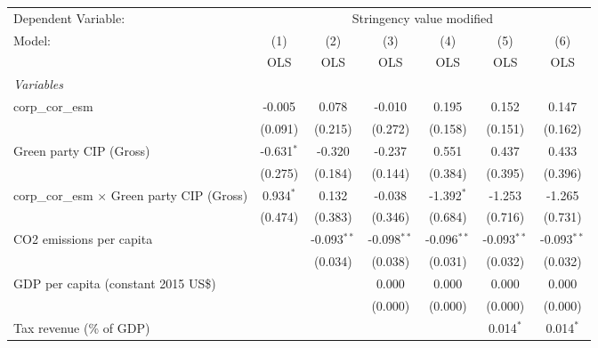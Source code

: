 
\begingroup
\centering
\begin{tabular}{lcccccc}
   \toprule
   Dependent Variable: & \multicolumn{6}{c}{Stringency value modified}\\
   Model:                                             & (1)          & (2)           & (3)           & (4)           & (5)           & (6)\\  
                                                      &  OLS         & OLS           & OLS           & OLS           & OLS           & OLS\\  
   \midrule
   \emph{Variables}\\
   corp\_cor\_esm                                     & -0.005       & 0.078         & -0.010        & 0.195         & 0.152         & 0.147\\   
                                                      & (0.091)      & (0.215)       & (0.272)       & (0.158)       & (0.151)       & (0.162)\\   
   Green party CIP (Gross)                            & -0.631$^{*}$ & -0.320        & -0.237        & 0.551         & 0.437         & 0.433\\   
                                                      & (0.275)      & (0.184)       & (0.144)       & (0.384)       & (0.395)       & (0.396)\\   
   corp\_cor\_esm $\times$ Green party CIP (Gross)    & 0.934$^{*}$  & 0.132         & -0.038        & -1.392$^{*}$  & -1.253        & -1.265\\   
                                                      & (0.474)      & (0.383)       & (0.346)       & (0.684)       & (0.716)       & (0.731)\\   
   CO2 emissions per capita                           &              & -0.093$^{**}$ & -0.098$^{**}$ & -0.096$^{**}$ & -0.093$^{**}$ & -0.093$^{**}$\\   
                                                      &              & (0.034)       & (0.038)       & (0.031)       & (0.032)       & (0.032)\\   
   GDP per capita (constant 2015 US\$)                &              &               & 0.000         & 0.000         & 0.000         & 0.000\\   
                                                      &              &               & (0.000)       & (0.000)       & (0.000)       & (0.000)\\   
   Tax revenue (\% of GDP)                            &              &               &               &               & 0.014$^{*}$   & 0.014$^{*}$\\   

\end{tabular}

